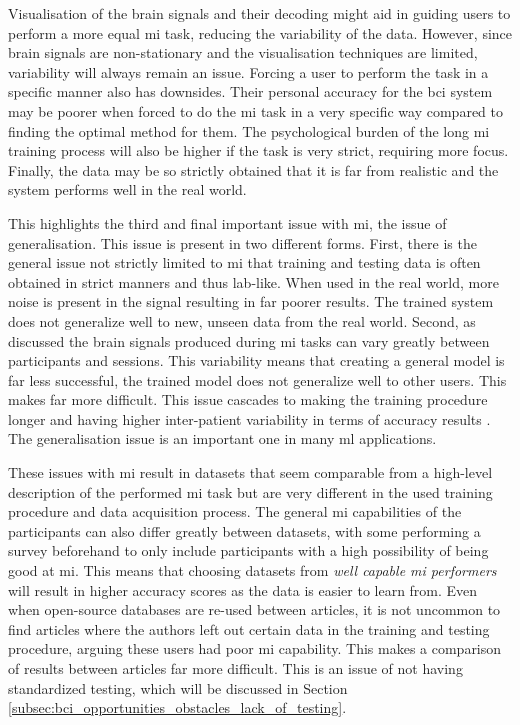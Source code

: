 Visualisation of the brain signals and their decoding might aid in guiding users to perform a more equal \gls{mi} task, reducing the variability of the data.
However, since brain signals are non-stationary and the visualisation techniques are limited, variability will always remain an issue.
Forcing a user to perform the task in a specific manner also has downsides.
Their personal accuracy for the \gls{bci} system may be poorer when forced to do the \gls{mi} task in a very specific way compared to finding the optimal method for them.
The psychological burden of the long \gls{mi} training process will also be higher if the task is very strict, requiring more focus.
Finally, the data may be so strictly obtained that it is far from realistic and the system performs well in the real world.

This highlights the third and final important issue with \gls{mi}, the issue of generalisation.
This issue is present in two different forms.
First, there is the general issue not strictly limited to \gls{mi} that training and testing data is often obtained in strict manners and thus lab-like.
When used in the real world, more noise is present in the signal resulting in far poorer results.
The trained system does not generalize well to new, unseen data from the real world.
Second, as discussed the brain signals produced during \gls{mi} tasks can vary greatly between participants and sessions.
This variability means that creating a general model is far less successful, the trained model does not generalize well to other users.
This makes  far more difficult.
This issue cascades to making the training procedure longer and having higher inter-patient variability in terms of accuracy results \citep{cheap_bci_feasibility, mi_training_hard}.
The generalisation issue is an important one in many \gls{ml} applications.

These issues with \gls{mi} result in datasets that seem comparable from a high-level description of the performed \gls{mi} task but are very different in the used training procedure and data acquisition process.
The general \gls{mi} capabilities of the participants can also differ greatly between datasets, with some performing a survey beforehand to only include participants with a high possibility of being good at \gls{mi}.
This means that choosing datasets from \textit{well capable \gls{mi} performers} will result in higher accuracy scores as the data is easier to learn from.
Even when open-source databases are re-used between articles, it is not uncommon to find articles where the authors left out certain data in the training and testing procedure, arguing these users had poor \gls{mi} capability.
This makes a comparison of results between articles far more difficult.
This is an issue of not having standardized testing, which will be discussed in Section \ref{subsec:bci_opportunities_obstacles_lack_of_testing}.


